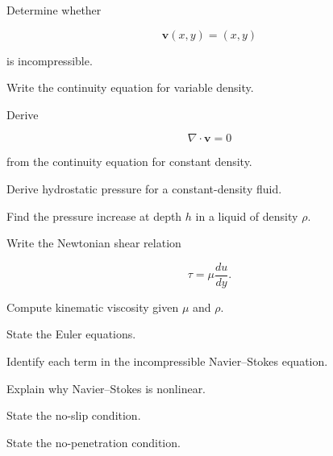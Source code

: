\begin{exercise}[2]
Determine whether

\[
\mathbf{v}(x,y)
=
(x,y)
\]

is incompressible.
\end{exercise}

\begin{exercise}[2]
Write the continuity equation for variable density.
\end{exercise}

\begin{exercise}[2]
Derive

\[
\nabla\cdot\mathbf{v}=0
\]

from the continuity equation for constant density.
\end{exercise}

\begin{exercise}[2]
Derive hydrostatic pressure for a constant-density fluid.
\end{exercise}

\begin{exercise}[2]
Find the pressure increase at depth \(h\) in a liquid of density \(\rho\).
\end{exercise}

\begin{exercise}[2]
Write the Newtonian shear relation

\[
\tau=\mu\frac{du}{dy}.
\]
\end{exercise}

\begin{exercise}[2]
Compute kinematic viscosity given \(\mu\) and \(\rho\).
\end{exercise}

\begin{exercise}[2]
State the Euler equations.
\end{exercise}

\begin{exercise}[2]
Identify each term in the incompressible Navier--Stokes equation.
\end{exercise}

\begin{exercise}[3]
Explain why Navier--Stokes is nonlinear.
\end{exercise}

\begin{exercise}[2]
State the no-slip condition.
\end{exercise}

\begin{exercise}[2]
State the no-penetration condition.
\end{exercise}

